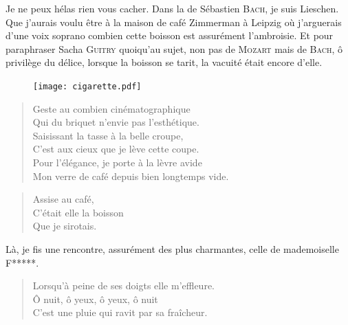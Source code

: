 

\begin{prose}
Je ne peux hélas rien vous cacher. Dans la  de Sébastien \textsc{Bach}, je suis Lieschen. Que j’aurais voulu être à la maison de café Zimmerman à Leipzig où j’arguerais d’une voix soprano combien  cette boisson est assurément l’ambroisie. Et pour paraphraser Sacha \textsc{Guitry} quoiqu’au sujet, non pas de \textsc{Mozart} mais de \textsc{Bach}, ô privilège du délice, lorsque la boisson se tarit, la vacuité était encore d’elle.
\end{prose}

\begin{figure}[h]
\centering
\texttt{[image: cigarette.pdf]}
\captionsetup{labelformat=empty}
\caption[Idéotexte de la ]{}
\end{figure}
\begin{verse}
Geste au combien cinématographique\\
Qui du briquet n’envie pas l’esthétique.\\
Saisissant la tasse à la belle croupe,\\
C’est aux cieux que je lève cette coupe.\\
Pour l’élégance, je porte à la lèvre avide\\
Mon verre de café depuis bien longtemps vide.
\end{verse}

\begin{verse}
Assise au café,\\
C’était elle la boisson\\
Que je sirotais.
\end{verse}

\begin{prose}
Là, je fis une rencontre, assurément des plus charmantes, celle de mademoiselle F*****.
\end{prose}



\begin{verse}
Lorsqu’à peine de ses doigts elle m’effleure.\\
Ô nuit, ô yeux, ô yeux, ô nuit\\
C’est une pluie qui ravit par sa fraîcheur.
\end{verse}

